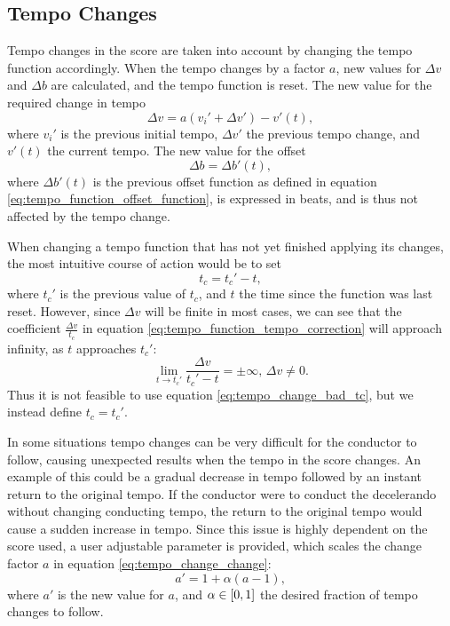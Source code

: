 \subsection{Tempo Changes}

Tempo changes in the score are taken into account
by changing the tempo function accordingly.
When the tempo changes by a factor $a$,
new values for $\Delta v$ and $\Delta b$ are calculated,
and the tempo function is reset.
The new value for the required change in tempo
\begin{equation}
\Delta v = a \left( v_i' + \Delta v' \right) - v'(t),
\label{eq:tempo_change_change}
\end{equation}
where $v_i'$ is the previous initial tempo,
$\Delta v'$ the previous tempo change,
and $v'(t)$ the current tempo.
The new value for the offset
\begin{equation}
\Delta b = \Delta b'(t),
\end{equation}
where $\Delta b'(t)$ is the previous offset function
as defined in equation \ref{eq:tempo_function_offset_function},
is expressed in beats,
and is thus not affected by the tempo change.

When changing a tempo function that has not yet
finished applying its changes,
the most intuitive course of action would be to set
\begin{equation}
\label{eq:tempo_change_bad_tc}
t_c = t_c' - t,
\end{equation}
where $t_c'$ is the previous value of $t_c$,
and $t$ the time since the function was last reset.
However, since $\Delta v$ will be finite in most cases,
we can see that the coefficient $\frac{\Delta v}{t_c}$
in equation \ref{eq:tempo_function_tempo_correction}
will approach infinity,
as $t$ approaches $t_c'$:
\begin{equation}
\lim_{t \to t_c'} \frac{\Delta v}{t_c' - t} = \pm \infty,
\, \Delta v \neq 0.
\end{equation}
Thus it is not feasible to use equation \ref{eq:tempo_change_bad_tc},
but we instead define $t_c = t_c'$.

In some situations tempo changes can be very difficult
for the conductor to follow,
causing unexpected results when the tempo in the score changes.
An example of this could be a gradual decrease in tempo
followed by an instant return to the original tempo.
If the conductor were to conduct the decelerando
without changing conducting tempo,
the return to the original tempo would cause
a sudden increase in tempo.
Since this issue is highly dependent on the score used,
a user adjustable parameter is provided,
which scales the change factor $a$ in equation
\ref{eq:tempo_change_change}:
\begin{equation}
a' = 1 + \alpha \left( a - 1 \right),
\end{equation}
where $a'$ is the new value for $a$,
and $\alpha \in \mathopen[ 0, 1 \mathclose]$
the desired fraction of tempo changes to follow.

